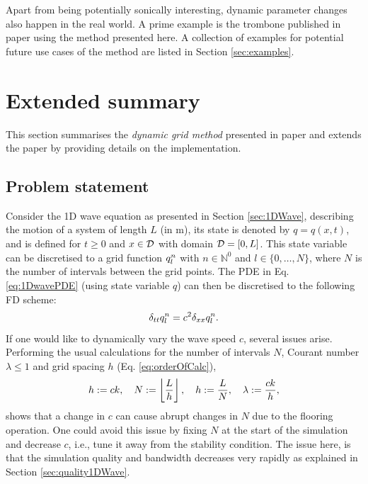 Apart from being potentially sonically interesting, dynamic parameter changes also happen in the real world. A prime example is the trombone published in paper \citeP[H] using the method presented here. A collection of examples for potential future use cases of the method are listed in Section \ref{sec:examples}.

\section{Extended summary}
This section summarises the \textit{dynamic grid method} presented in paper \citeP[G] and extends the paper by providing details on the implementation. 

\subsection{Problem statement}
Consider the 1D wave equation  as presented in Section \ref{sec:1DWave}, describing the motion of a system of length $L$ (in m), its state is denoted by $q = q(x,t)$, and is defined for $t\geq 0$ and $x\in\mathcal{D}$ with domain $\mathcal{D} = [0, L]$. This state variable can be discretised to a grid function $q_l^n$ with $n\in \mathbb{N}^0$ and $l \in \{0, \hdots, N\}$, where $N$ is the number of intervals between the grid points. The PDE in Eq. \eqref{eq:1DwavePDE} (using state variable $q$) can then be discretised to the following FD scheme:
\begin{equation}\label{eq:1DWaveDynamic}
    \delta_{tt} q_l^n = c^2\delta_{xx} q_l^n.
\end{equation}
If one would like to dynamically vary the wave speed $c$, several issues arise. Performing the usual calculations for the number of intervals $N$, Courant number $\lambda\leq 1$ and grid spacing $h$ (Eq. \eqref{eq:orderOfCalc}),
\begin{equation}\label{eq:dynamicOrderOfCalc}
    h := ck, \quad N := \floor[\frac{L}{h}], \quad h := \frac{L}{N}, \quad \lambda := \frac{ck}{h},
\end{equation}
shows that a change in $c$ can cause abrupt changes in $N$ due to the flooring operation. One could avoid this issue by fixing $N$ at the start of the simulation and decrease $c$, i.e., tune it away from the stability condition. The issue here, is that the simulation quality and bandwidth decreases very rapidly as explained in Section \ref{sec:quality1DWave}. 

